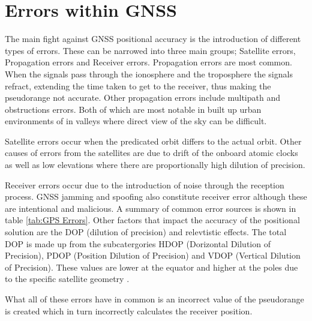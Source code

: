\section{Errors within GNSS}
The main fight against GNSS positional accuracy is the introduction of different types of errors. These can be narrowed into three main groups; Satellite errors,
Propagation errors and Receiver errors. Propagation errors are most common. When the signals pass through the ionosphere and the troposphere the signals refract, extending
the time taken to get to the receiver, thus making the pseudorange not accurate. Other propagation errors include multipath and obstructions errors. Both of which are
most notable in built up urban environments of in valleys where direct view of the sky can be difficult.

Satellite errors occur when the predicated orbit differs to the actual orbit. Other causes of errors from the satellites are due to drift of the onboard atomic clocks as
well as low elevations where there are proportionally high dilution of precision.

Receiver errors occur due to the introduction of noise through the reception process. GNSS jamming and spoofing also constitute receiver error although these are
intentional and malicious. A summary of common error sources is shown in table \ref{tab:GPS Errors}.
Other factors that impact the accuracy of the positional solution are the DOP (dilution of precision) and relevtistic effects. The total DOP is made up from the
subcatergories HDOP (Dorizontal Dilution of Precision), PDOP (Position Dilution of Precision) and VDOP (Vertical Dilution of Precision). These values are lower at the
equator and higher at the poles due to the specific satellite geometry \cite{RN62}.

What all of these errors have in common is an incorrect value of the pseudorange is created which in turn incorrectly calculates the receiver position.


